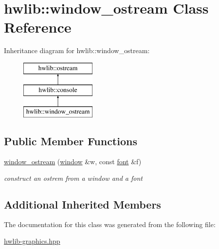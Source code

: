 \hypertarget{classhwlib_1_1window__ostream}{}\section{hwlib\+:\+:window\+\_\+ostream Class Reference}
\label{classhwlib_1_1window__ostream}
Inheritance diagram for hwlib\+:\+:window\+\_\+ostream\+:\begin{figure}[H]
\begin{center}
\leavevmode
\includegraphics[height=3.000000cm]{classhwlib_1_1window__ostream}
\end{center}
\end{figure}
\subsection*{Public Member Functions}
\begin{DoxyCompactItemize}
\item 
\hyperlink{classhwlib_1_1window__ostream_a6dd892c39405c76d0361dbe73dc256f8}{window\+\_\+ostream} (\hyperlink{classhwlib_1_1window}{window} \&w, const \hyperlink{classhwlib_1_1font}{font} \&f)\hypertarget{classhwlib_1_1window__ostream_a6dd892c39405c76d0361dbe73dc256f8}{}\label{classhwlib_1_1window__ostream_a6dd892c39405c76d0361dbe73dc256f8}

\begin{DoxyCompactList}\small\item\em construct an ostrem from a window and a font \end{DoxyCompactList}\end{DoxyCompactItemize}
\subsection*{Additional Inherited Members}


The documentation for this class was generated from the following file\+:\begin{DoxyCompactItemize}
\item 
\hyperlink{hwlib-graphics_8hpp}{hwlib-\/graphics.\+hpp}\end{DoxyCompactItemize}
